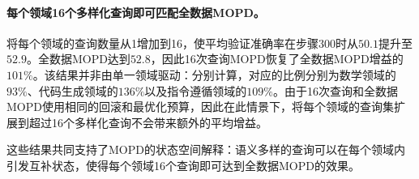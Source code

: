 \paragraph{每个领域16个多样化查询即可匹配全数据MOPD。}
将每个领域的查询数量从1增加到16，使平均验证准确率在步骤\(300\)时从\(50.1\)提升至\(52.9\)。全数据MOPD达到\(52.8\)，因此16次查询MOPD恢复了全数据MOPD增益的\(101\%\)。该结果并非由单一领域驱动：分别计算，对应的比例分别为数学领域的\(93\%\)、代码生成领域的\(136\%\)以及指令遵循领域的\(109\%\)。由于16次查询和全数据MOPD使用相同的回滚和最优化预算，因此在此情景下，将每个领域的查询集扩展到超过16个多样化查询不会带来额外的平均增益。

这些结果共同支持了MOPD的状态空间解释：语义多样的查询可以在每个领域内引发互补状态，使得每个领域16个查询即可达到全数据MOPD的效果。


